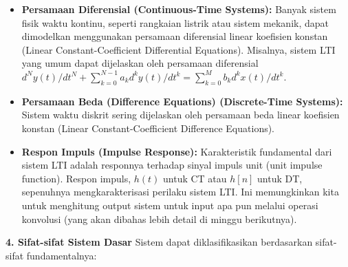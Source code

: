 \documentclass[
  letterpaper,
  DIV=11,
  numbers=noendperiod]{scrreprt}
\providecommand{\tightlist}{%
  \setlength{\itemsep}{0pt}\setlength{\parskip}{0pt}}
\begin{document}
\begin{itemize}
\tightlist
\item
  \textbf{Persamaan Diferensial (Continuous-Time Systems):} Banyak
  sistem fisik waktu kontinu, seperti rangkaian listrik atau sistem
  mekanik, dapat dimodelkan menggunakan persamaan diferensial linear
  koefisien konstan (Linear Constant-Coefficient Differential
  Equations). Misalnya, sistem LTI yang umum dapat dijelaskan oleh
  persamaan diferensial
  \(d^Ny(t)/dt^N + \sum_{k=0}^{N-1} a_k d^ky(t)/dt^k = \sum_{k=0}^{M} b_k d^kx(t)/dt^k\).
\item
  \textbf{Persamaan Beda (Difference Equations) (Discrete-Time
  Systems):} Sistem waktu diskrit sering dijelaskan oleh persamaan beda
  linear koefisien konstan (Linear Constant-Coefficient Difference
  Equations).
\item
  \textbf{Respon Impuls (Impulse Response):} Karakteristik fundamental
  dari sistem LTI adalah responnya terhadap sinyal impuls unit (unit
  impulse function). Respon impuls, \(h(t)\) untuk CT atau \(h[n]\)
  untuk DT, sepenuhnya mengkarakterisasi perilaku sistem LTI. Ini
  memungkinkan kita untuk menghitung output sistem untuk input apa pun
  melalui operasi konvolusi (yang akan dibahas lebih detail di minggu
  berikutnya).
\end{itemize}

\textbf{4. Sifat-sifat Sistem Dasar} Sistem dapat diklasifikasikan
berdasarkan sifat-sifat fundamentalnya:
\end{document}
